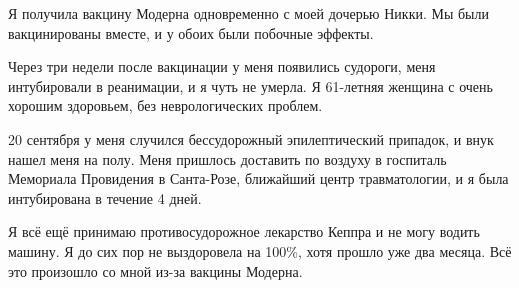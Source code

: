 Я получила вакцину Модерна одновременно с моей дочерью Никки. Мы были
вакцинированы вместе, и у обоих были побочные эффекты.

Через три недели после вакцинации у меня появились судороги, меня интубировали в
реанимации, и я чуть не умерла. Я 61-летняя женщина с очень хорошим здоровьем,
без неврологических проблем.

20 сентября у меня случился бессудорожный эпилептический припадок, и внук нашел
меня на полу. Меня пришлось доставить по воздуху в госпиталь Мемориала
Провидения в Санта-Розе, ближайший центр травматологии, и я была интубирована в
течение 4 дней.

Я всё ещё принимаю противосудорожное лекарство Кеппра и не могу водить машину. Я
до сих пор не выздоровела на 100\%, хотя прошло уже два месяца. Всё это
произошло со мной из-за вакцины Модерна.
